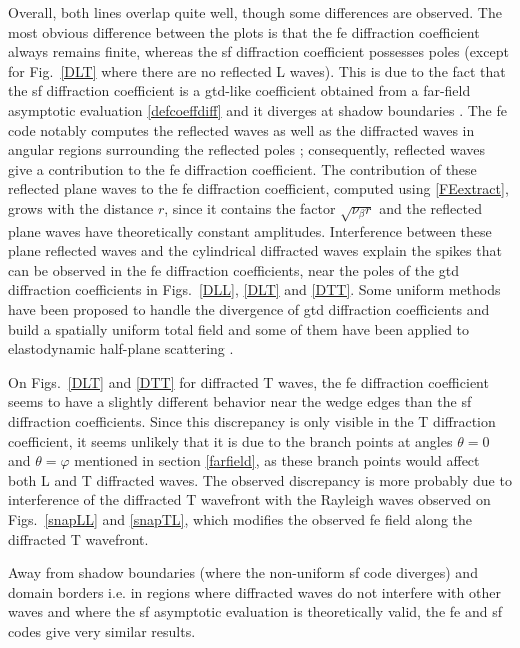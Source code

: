 Overall, both lines overlap quite well, though some differences are observed. The most obvious difference between the plots is that the \acrshort{fe} diffraction coefficient always remains finite, whereas the \acrshort{sf} diffraction coefficient possesses poles (except for Fig.~\ref{DLT} where there are no reflected L waves). This is due to the fact that the \acrshort{sf} diffraction coefficient is a \acrshort{gtd}-like coefficient obtained from a far-field asymptotic evaluation \eqref{defcoeffdiff} and it diverges at shadow boundaries \cite{GTD,Audrey}. The \acrshort{fe} code notably computes the reflected waves as well as the diffracted waves in angular regions surrounding the reflected poles ; consequently, reflected waves give a contribution to the \acrshort{fe} diffraction coefficient. The contribution of these reflected plane waves to the \acrshort{fe} diffraction coefficient, computed using \eqref{FEextract}, grows with the distance $r$, since it contains the factor $\sqrt{\nu_{\beta}r}$ and the reflected plane waves have theoretically constant amplitudes. Interference between these plane reflected waves and the cylindrical diffracted waves explain the spikes that can be observed in the \acrshort{fe} diffraction coefficients, near the poles of the \acrshort{gtd} diffraction coefficients in Figs.~\ref{DLL}, \ref{DLT} and \ref{DTT}. Some uniform methods have been proposed to handle the divergence of \acrshort{gtd} diffraction coefficients and build a spatially uniform total field and some of them have been applied to elastodynamic half-plane scattering \cite{Audrey, Zernov, PTDdarmon}.

On Figs.~\ref{DLT} and \ref{DTT} for diffracted T waves, the \acrshort{fe} diffraction coefficient seems to have a slightly different behavior near the wedge edges than the \acrshort{sf} diffraction coefficients. Since this discrepancy is only visible in the T diffraction coefficient, it seems unlikely that it is due to the branch points at angles $\theta=0$ and $\theta=\varphi$ mentioned in section \ref{farfield}, as these branch points would affect both L and T diffracted waves. The observed discrepancy is more probably due to interference of the diffracted T wavefront with the Rayleigh waves observed on Figs.~\ref{snapLL} and \ref{snapTL}, which modifies the observed \acrshort{fe} field along the diffracted T wavefront.

Away from shadow boundaries (where the non-uniform \acrshort{sf} code diverges) and domain borders i.e. in regions where diffracted waves do not interfere with other waves and where the \acrshort{sf} asymptotic evaluation is theoretically valid, the \acrshort{fe} and \acrshort{sf} codes give very similar results. 

